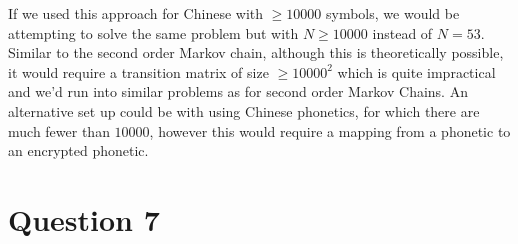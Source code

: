 \documentclass[12pt]{article}
\begin{document}
\begin{enumerate}
If we used this approach for Chinese with $\geq 10000$ symbols, we would be attempting to solve the same problem but with $N\geq10000$ instead of $N=53$. Similar to the second order Markov chain, although this is theoretically possible, it would require a transition matrix of size $\geq10000^2$ which is quite impractical and we'd run into similar problems as for second order Markov Chains. An alternative set up  could be with using Chinese phonetics, for which there are much fewer than $10000$, however this would require a mapping from a phonetic to an encrypted phonetic.

\end{enumerate}
\newpage
\section*{Question 7}
\end{document}
